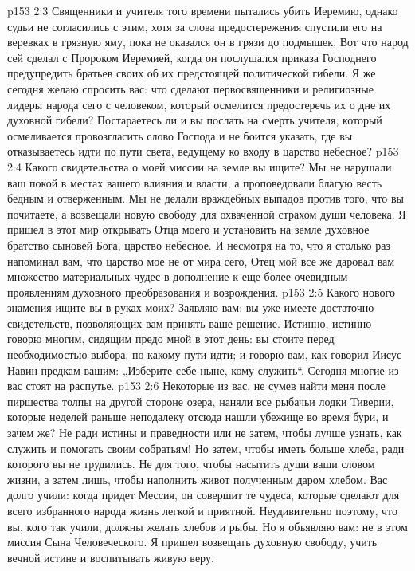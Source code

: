 \vs p153 2:3 Священники и учителя того времени пытались убить Иеремию, однако судьи не согласились с этим, хотя за слова предостережения спустили его на веревках в грязную яму, пока не оказался он в грязи до подмышек. Вот что народ сей сделал с Пророком Иеремией, когда он послушался приказа Господнего предупредить братьев своих об их предстоящей политической гибели. Я же сегодня желаю спросить вас: что сделают первосвященники и религиозные лидеры народа сего с человеком, который осмелится предостеречь их о дне их духовной гибели? Постараетесь ли и вы послать на смерть учителя, который осмеливается провозгласить слово Господа и не боится указать, где вы отказываетесь идти по пути света, ведущему ко входу в царство небесное?
\vs p153 2:4 Какого свидетельства о моей миссии на земле вы ищите? Мы не нарушали ваш покой в местах вашего влияния и власти, а проповедовали благую весть бедным и отверженным. Мы не делали враждебных выпадов против того, что вы почитаете, а возвещали новую свободу для охваченной страхом души человека. Я пришел в этот мир открывать Отца моего и установить на земле духовное братство сыновей Бога, царство небесное. И несмотря на то, что я столько раз напоминал вам, что царство мое не от мира сего, Отец мой все же даровал вам множество материальных чудес в дополнение к еще более очевидным проявлениям духовного преобразования и возрождения.
\vs p153 2:5 Какого нового знамения ищите вы в руках моих? Заявляю вам: вы уже имеете достаточно свидетельств, позволяющих вам принять ваше решение. Истинно, истинно говорю многим, сидящим предо мной в этот день: вы стоите перед необходимостью выбора, по какому пути идти; и говорю вам, как говорил Иисус Навин предкам вашим: „Изберите себе ныне, кому служить“. Сегодня многие из вас стоят на распутье.
\vs p153 2:6 Некоторые из вас, не сумев найти меня после пиршества толпы на другой стороне озера, наняли все рыбачьи лодки Тиверии, которые неделей раньше неподалеку отсюда нашли убежище во время бури, и зачем же? Не ради истины и праведности или не затем, чтобы лучше узнать, как служить и помогать своим собратьям! Но затем, чтобы иметь больше хлеба, ради которого вы не трудились. Не для того, чтобы насытить души ваши словом жизни, а затем лишь, чтобы наполнить живот полученным даром хлебом. Вас долго учили: когда придет Мессия, он совершит те чудеса, которые сделают для всего избранного народа жизнь легкой и приятной. Неудивительно поэтому, что вы, кого так учили, должны желать хлебов и рыбы. Но я объявляю вам: не в этом миссия Сына Человеческого. Я пришел возвещать духовную свободу, учить вечной истине и воспитывать живую веру.
